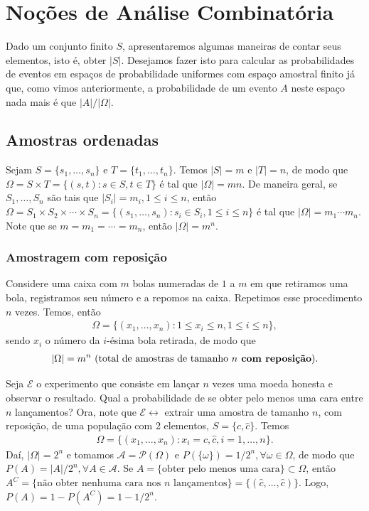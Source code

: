 \documentclass[../Notas.tex]{subfiles}
\begin{document}
\section{Noções de Análise Combinatória}
Dado um conjunto finito $S$, apresentaremos algumas maneiras de contar seus elementos, isto é, obter $|S|$. Desejamos fazer isto para calcular as probabilidades de eventos em espaços de probabilidade uniformes com espaço amostral finito já que, como vimos anteriormente, a probabilidade de um evento $A$ neste espaço nada mais é que $|A|/|\Omega|$.

\subsection{Amostras ordenadas}
Sejam $S = \{ s_1, \dots, s_n \}$ e $T = \{t_1, \dots, t_n\}$. Temos $|S| = m$ e $|T| = n$, de modo que $\Omega = S\times T = \{ (s,t) : s\in S, t\in T \}$ é tal que $|\Omega| = mn$. De maneira geral, se $S_1, \dots, S_n$ são tais que $|S_i| = m_i, 1\leq i\leq n$, então $\Omega = S_1\times S_2\times\cdots\times S_n = \{ (s_1, \dots, s_n) : s_i\in S_i, 1\leq i\leq n \}$ é tal que $|\Omega| = m_1\cdots m_n$. Note que se $m = m_1 = \cdots = m_n$, então $|\Omega| = m^n$.

\subsubsection{Amostragem com reposição}
Considere uma caixa com $m$ bolas numeradas de $1$ a $m$ em que retiramos uma bola, registramos seu número e a repomos na caixa. Repetimos esse procedimento $n$ vezes. Temos, então
\begin{align*}
    \Omega = \{ (x_1, \dots, x_n) : 1\leq x_i\leq n, 1\leq i\leq n \},
\end{align*}
sendo $x_i$ o número da $i$-ésima bola retirada, de modo que
\begin{align*}
    |\Omega| = m^n \ \text{(total de amostras de tamanho } n \text{\textbf{ com reposição})}.
\end{align*}

\begin{example}
Seja $\mathcal{E}$ o experimento que consiste em lançar $n$ vezes uma moeda honesta e observar o resultado. Qual a probabilidade de se obter pelo menos uma cara entre $n$ lançamentos? Ora, note que $\mathcal{E} \leftrightarrow$ extrair uma amostra de tamanho $n$, com reposição, de uma população com 2 elementos, $S = \{ c, \widehat{c} \}$. Temos
\begin{align*}
    \Omega = \{ (x_1, \dots, x_n) : x_i = c, \widehat{c}, i = 1, \dots, n \}.
\end{align*}
Daí, $|\Omega| = 2^n$ e tomamos $\mathcal{A} = \mathcal{P}(\Omega)$ e $P(\{\omega\}) = 1/2^n, \forall \omega\in\Omega$, de modo que $P(A) = |A|/2^n, \forall A\in\mathcal{A}$. Se $A = \{\text{obter pelo menos uma cara}\}\subset\Omega$, então $A^C = \{\text{não obter nenhuma cara nos } n \text{ lançamentos}\} = \{ (\widehat{c}, \dots, \widehat{c}) \}$. Logo, $P(A) = 1 - P(A^C) = 1 - 1/2^n$.
\end{example}
\end{document}
